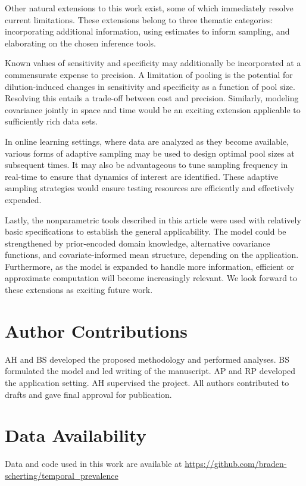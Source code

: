 \documentclass{article}
\begin{document}
Other natural extensions to this work exist, some of which immediately resolve current limitations. These extensions belong to three thematic categories: incorporating additional information, using estimates to inform sampling, and elaborating on the chosen inference tools.

Known values of sensitivity and specificity may additionally be incorporated at a commensurate expense to precision. A limitation of pooling is the potential for dilution-induced changes in sensitivity and specificity as a function of pool size. Resolving this entails a trade-off between cost and precision. Similarly, modeling covariance jointly in space and time would be an exciting extension applicable to sufficiently rich data sets. 

In online learning settings, where data are analyzed as they become available, various forms of adaptive sampling may be used to design optimal pool sizes at subsequent times. It may also be advantageous to tune sampling frequency in real-time to ensure that dynamics of interest are identified. These adaptive sampling strategies would ensure testing resources are efficiently and effectively expended.

Lastly, the nonparametric tools described in this article were used with relatively basic specifications to establish the general applicability. The model could be strengthened by prior-encoded domain knowledge, alternative covariance functions, and covariate-informed mean structure, depending on the application. Furthermore, as the model is expanded to handle more information, efficient or approximate computation will become increasingly relevant. We look forward to these extensions as exciting future work. 

\section*{Author Contributions}
AH and BS developed the proposed methodology and performed analyses. BS formulated the model and led writing of the manuscript. AP and RP developed the application setting. AH supervised the project. All authors contributed to drafts and gave final approval for publication.

\section*{Data Availability}
Data and code used in this work are available at \url{https://github.com/braden-scherting/temporal_prevalence}



  
  
\end{document}
